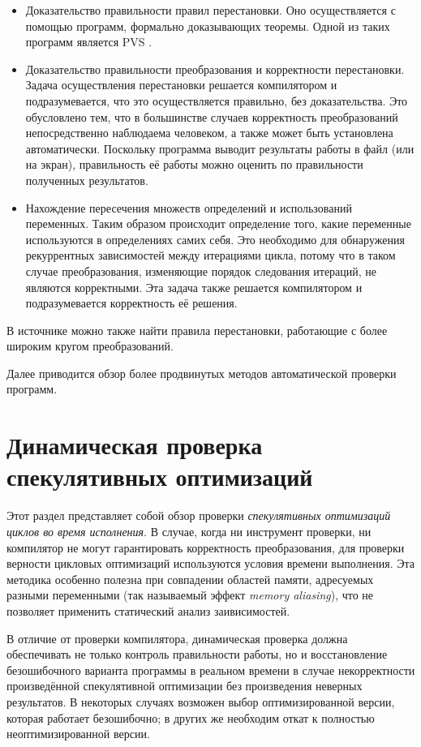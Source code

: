 \begin{itemize}
	\item Доказательство правильности правил перестановки. Оно осуществляется с помощью программ, формально доказывающих теоремы. Одной из таких программ является PVS \cite{SOR93}.
	\item Доказательство правильности преобразования и корректности перестановки. Задача осуществления перестановки решается компилятором и подразумевается, что это осуществляется правильно, без доказательства. Это обусловлено тем, что в большинстве случаев корректность преобразований непосредственно наблюдаема человеком, а также может быть установлена автоматически. Поскольку программа выводит результаты работы в файл (или на экран), правильность её работы можно оценить по правильности полученных результатов.
	\item Нахождение пересечения множеств определений и использований переменных. Таким образом происходит определение того, какие переменные используются в определениях самих себя. Это необходимо для обнаружения рекуррентных зависимостей между итерациями цикла, потому что в таком случае преобразования, изменяющие порядок следования итераций, не являются корректными. Эта задача также решается компилятором и подразумевается корректность её решения.
\end{itemize}

В источнике \cite{ZPL00} можно также найти правила перестановки, работающие с более широким кругом преобразований.

Далее приводится обзор более продвинутых методов автоматической проверки программ.

\section{Динамическая проверка спекулятивных оптимизаций}

Этот раздел представляет собой обзор проверки \emph{спекулятивных оптимизаций циклов во время исполнения}. В случае, когда ни инструмент проверки, ни компилятор не могут гарантировать корректность преобразования, для проверки верности цикловых оптимизаций используются условия времени выполнения. Эта методика особенно полезна при совпадении областей памяти, адресуемых разными переменными (так называемый эффект \emph{memory aliasing}), что не позволяет применить статический анализ заивисимостей.

В отличие от проверки компилятора, динамическая проверка должна обеспечивать не только контроль правильности работы, но и восстановление безошибочного варианта программы в реальном времени в случае некорректности произведённой спекулятивной оптимизации без произведения неверных результатов. В некоторых случаях возможен выбор оптимизированной версии, которая работает безошибочно; в других же необходим откат к полностью неоптимизированной версии.

